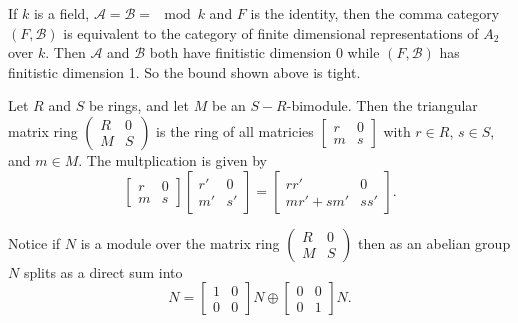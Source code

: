 \begin{example}
	If $k$ is a field, $\mathcal A = \mathcal B = \mod k$ and $F$ is the identity, then the comma category $(F, \mathcal B)$ is equivalent to the category of finite dimensional representations of $A_2$ over $k$. Then $\mathcal A$ and $\mathcal B$ both have finitistic dimension 0 while $(F, \mathcal B)$ has finitistic dimension 1. So the bound shown above is tight. 
\end{example}

\begin{defn}
	Let $R$ and $S$ be rings, and let $M$ be an $S-R$-bimodule. Then the triangular matrix ring $\begin{pmatrix}
	R & 0\\
	M & S
	\end{pmatrix}$ is the ring of all matricies $\begin{bmatrix}
	r & 0\\
	m & s
	\end{bmatrix}$ with $r\in R$, $s\in S$, and $m\in M$. The multplication is given by
	$$\begin{bmatrix}
	r & 0\\
	m & s
	\end{bmatrix}\begin{bmatrix}
	r' & 0\\
	m' & s'
	\end{bmatrix}=\begin{bmatrix}
	rr' & 0\\
	mr' + sm' & ss'
	\end{bmatrix}.$$
\end{defn}

Notice if $N$ is a module over the matrix ring $\begin{pmatrix}
R & 0\\
M & S
\end{pmatrix}$ then as an abelian group $N$ splits as a direct sum into
$$N=
\begin{bmatrix}
1 & 0\\
0 & 0
\end{bmatrix}N \oplus
\begin{bmatrix}
0 & 0\\
0 & 1
\end{bmatrix}N.$$

